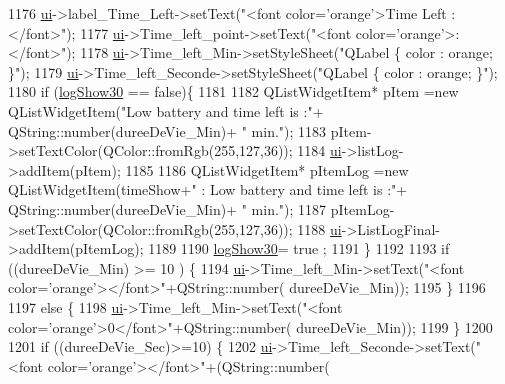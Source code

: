 \begin{DoxyCode}
{1176               \hyperlink{a00008_a6dc041ef6a2ffb329928d2913e8344e6}{ui}->label\_Time\_Left->setText(\textcolor{stringliteral}{"<font color='orange'>Time Left : </font>"});
1177               \hyperlink{a00008_a6dc041ef6a2ffb329928d2913e8344e6}{ui}->Time\_left\_point->setText(\textcolor{stringliteral}{"<font color='orange'>: </font>"});
1178               \hyperlink{a00008_a6dc041ef6a2ffb329928d2913e8344e6}{ui}->Time\_left\_Min->setStyleSheet(\textcolor{stringliteral}{"QLabel \{ color : orange; \}"});
1179               \hyperlink{a00008_a6dc041ef6a2ffb329928d2913e8344e6}{ui}->Time\_left\_Seconde->setStyleSheet(\textcolor{stringliteral}{"QLabel \{ color : orange; \}"});
1180               \textcolor{keywordflow}{if} (\hyperlink{a00008_adc5f0ca2ddba7e52119b6f23ec7c7922}{logShow30} == \textcolor{keyword}{false})\{
1181 
1182                   QListWidgetItem* pItem =\textcolor{keyword}{new} QListWidgetItem(\textcolor{stringliteral}{"Low battery and time left is :"}+ 
      QString::number(dureeDeVie\_Min)+ \textcolor{stringliteral}{" min."});
1183                   pItem->setTextColor(QColor::fromRgb(255,127,36));
1184                   \hyperlink{a00008_a6dc041ef6a2ffb329928d2913e8344e6}{ui}->listLog->addItem(pItem);
1185 
1186                   QListWidgetItem* pItemLog =\textcolor{keyword}{new} QListWidgetItem(timeShow+\textcolor{stringliteral}{" : Low battery and time left is
       :"}+ QString::number(dureeDeVie\_Min)+ \textcolor{stringliteral}{" min."});
1187                   pItemLog->setTextColor(QColor::fromRgb(255,127,36));
1188                   \hyperlink{a00008_a6dc041ef6a2ffb329928d2913e8344e6}{ui}->ListLogFinal->addItem(pItemLog);
1189 
1190                   \hyperlink{a00008_adc5f0ca2ddba7e52119b6f23ec7c7922}{logShow30}= true ;
1191               \}
1192 
1193               \textcolor{keywordflow}{if} ((dureeDeVie\_Min) >=  10 ) \{
1194                   \hyperlink{a00008_a6dc041ef6a2ffb329928d2913e8344e6}{ui}->Time\_left\_Min->setText(\textcolor{stringliteral}{"<font color='orange'></font>"}+QString::number(
      dureeDeVie\_Min));
1195               \}
1196 
1197               \textcolor{keywordflow}{else} \{
1198                   \hyperlink{a00008_a6dc041ef6a2ffb329928d2913e8344e6}{ui}->Time\_left\_Min->setText(\textcolor{stringliteral}{"<font color='orange'>0</font>"}+QString::number(
      dureeDeVie\_Min));
1199               \}
1200 
1201               \textcolor{keywordflow}{if} ((dureeDeVie\_Sec)>=10) \{
1202                   \hyperlink{a00008_a6dc041ef6a2ffb329928d2913e8344e6}{ui}->Time\_left\_Seconde->setText(\textcolor{stringliteral}{"<font color='orange'></font>"}+(QString::number(
}
\end{DoxyCode}
